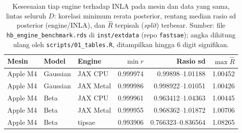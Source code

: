 \begin{table}[htbp]
\centering
\caption{Kesesuaian tiap engine terhadap INLA pada mesin dan data yang sama, lintas seluruh $D$: korelasi minimum rerata posterior, rentang median rasio sd posterior (engine/INLA), dan $\hat R$ terpisah (\emph{split}) terbesar. Sumber: file \texttt{hb\_engine\_benchmark.rds} di \texttt{inst/extdata} (repo \texttt{fastsae}); angka dihitung ulang oleh \texttt{scripts/01\_tables.R}, ditampilkan hingga 6 digit signifikan.}
\label{tab:engine-equiv}
\small
\begin{tabular}{lllrrr}
\toprule
Mesin & Model & Engine & $\min r$ & Rasio sd & $\max \hat R$ \\
\midrule
Apple M4 & Gaussian & JAX CPU & 0.999974 & 0.99898--1.01188 & 1.00452 \\
Apple M4 & Gaussian & JAX Metal & 0.999986 & 0.998922--1.01051 & 1.00426 \\
Apple M4 & Beta & JAX CPU & 0.999961 & 0.963412--1.04363 & 1.00445 \\
Apple M4 & Beta & JAX Metal & 0.999955 & 0.968362--1.01872 & 1.00706 \\
Apple M4 & Beta & tipsae & 0.993906 & 0.766323--0.836564 & 1.08265 \\
\bottomrule
\end{tabular}
\end{table}

